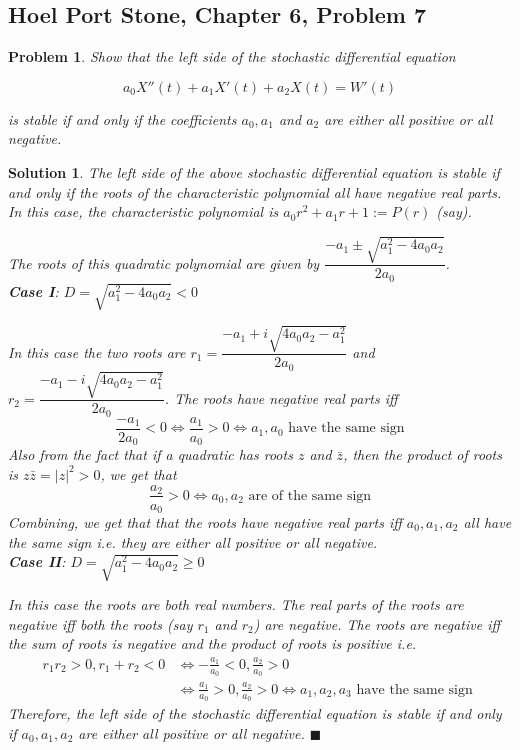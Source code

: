 \documentclass[12pt]{article}
\theoremstyle{problemstyle}
\newtheorem{pbm}{Problem}
\newtheorem*{solution*}{Solution}
\newenvironment{problem}{
\begin{tcolorbox}[colback=green!10!white,colframe=black!75!black, parbox = false]\begin{pbm} }{\end{pbm}\end{tcolorbox} }
\begin{document}
\subsection{Hoel Port Stone, Chapter 6, Problem 7}
\begin{problem}
Show that the left side of the stochastic differential equation 

$$
a_0 X''(t) + a_1 X'(t) + a_2 X(t) = W'(t)
$$

\noindent is stable if and only if the coefficients $a_0, a_1$ and $a_2$ are either all positive or all negative.
\end{problem}
\begin{solution*}
The left side of the above stochastic differential equation is stable if and only if the roots of the characteristic polynomial all have negative real parts. In this case, the characteristic polynomial is $a_0r^2 + a_1r + 1 := P(r)$ (say).

The roots of this quadratic polynomial are given by $\dfrac{-a_1 \pm \sqrt{a_1^2- 4a_0a_2}}{2a_0}$. 
\vspace{0.4cm}\\
\textbf{Case I}: $D = \sqrt{a_1^2- 4a_0a_2} < 0$

In this case the two roots are $r_1 = \dfrac{-a_1 +i \sqrt{4a_0a_2 - a_1^2}}{2a_0}$ and $r_2 = \dfrac{-a_1 - i \sqrt{4a_0a_2 - a_1^2}}{2a_0}$. The roots have negative real parts iff $$\frac{-a_1}{2a_0} < 0 \iff \frac{a_1}{a_0} > 0 \iff a_1,a_0 \text{ have the same sign}$$  Also from the fact that if a quadratic has roots $z$ and $\bar{z}$, then the product of roots is $z\bar{z} = |z|^2 > 0$, we get that $$\frac{a_2}{a_0} > 0 \iff a_0,a_2 \text{ are of the same sign}$$ Combining, we get that that the roots have negative real parts iff $a_0,a_1,a_2$ all have the same sign i.e. they are either all positive or all negative.
\vspace{0.5cm}\\
\textbf{Case II}: $D = \sqrt{a_1^2- 4a_0a_2} \geq 0$

In this case the roots are both real numbers. The real parts of the roots are negative iff both the roots (say $r_1$ and $r_2$) are negative. The roots are negative iff the sum of roots is negative and the product of roots is positive i.e. 
\begin{align*} 
r_1r_2 >0 , r_1+r_2 < 0 &\iff -\frac{a_1}{a_0} < 0, \frac{a_2}{a_0} >0 \\ &\iff \frac{a_1}{a_0} > 0 , \frac{a_2}{a_0} >0 \iff a_1,a_2,a_3\text{ have the same sign } 
\end{align*}
Therefore, the left side of the stochastic differential equation is stable if and only if $a_0,a_1,a_2$ are either all positive or all negative.
\hfill $\blacksquare$
\end{solution*}
\end{document}
